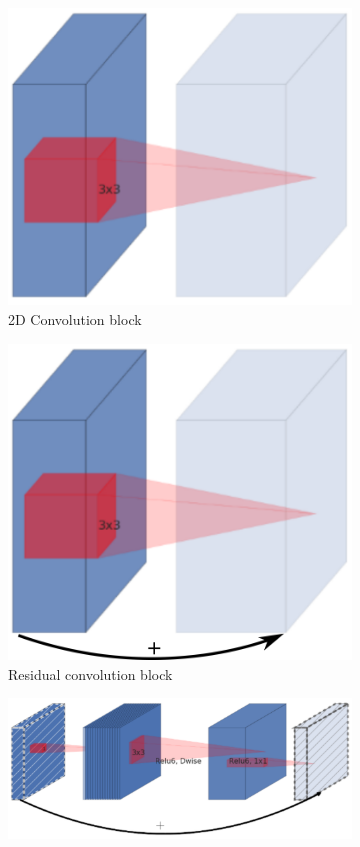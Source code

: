\begin{figure}
  \begin{center}
    \begin{subfigure}[t]{.24\linewidth}
      \centering
      \includegraphics[width=.8\linewidth]{figures/mobilenetv2_conv.png}
      \caption{2D Convolution block}
      \label{fig:convblock}
    \end{subfigure}
    \begin{subfigure}[t]{.24\linewidth}
      \centering
      \includegraphics[width=.8\linewidth]{figures/mobilenetv2_resnet.png}
      \caption{Residual convolution block}
      \label{fig:resblock}
    \end{subfigure}
    \begin{subfigure}[t]{.5\linewidth}
      \centering
      \includegraphics[width=.99\linewidth]{figures/mobilenetv2_inverted_residual_botleneck.png}

\end{subfigure}
\end{center}
\end{figure}

